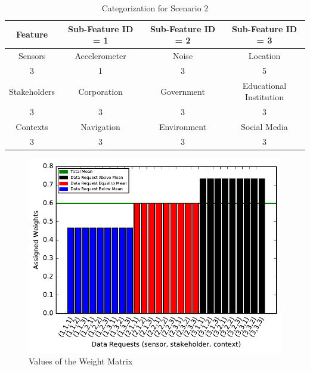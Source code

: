 \begin{table}[h!]
  \centering
  \caption{Categorization for Scenario 2}
  \label{tab:scenario3}
  \begin{tabular}{cccc}
    \toprule
    Feature & Sub-Feature ID = 1 & Sub-Feature ID = 2 & Sub-Feature ID = 3\\
    \midrule
    Sensors & Accelerometer & Noise & Location\\
     3 & 1 & 3 & 5\\ \hhline{====}
     Stakeholders & Corporation & Government & Educational Institution\\
     3 & 3 & 3 & 3\\ \hhline{====}
     Contexts & Navigation & Environment & Social Media\\
     3 & 3 & 3 & 3\\ 
    \bottomrule
  \end{tabular}
\end{table}



\begin{figure}[ht!]
\centering
\includegraphics[width=\textwidth,keepaspectratio]{./images/weight_3}
\caption{Values of the Weight Matrix \label{weight3}}
\end{figure}

